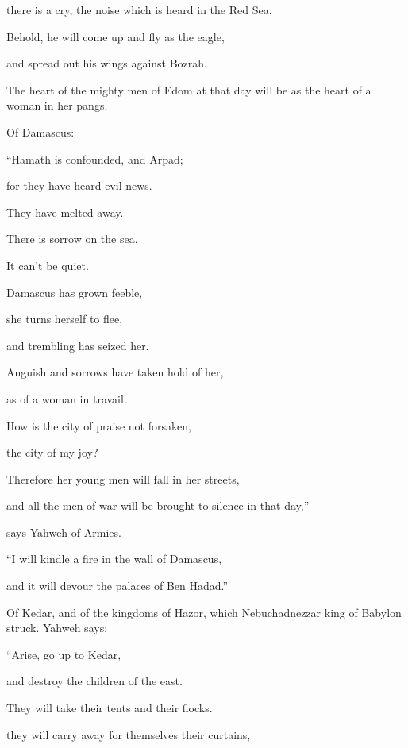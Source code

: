 {\par }{\QB there is a cry, the noise which is heard in the Red Sea.
\par }{\Q {}Behold, he will come up and fly as the eagle,
\par }{\QB and spread out his wings against Bozrah.
\par }{\QB The heart of the mighty men of Edom at that day will be as the heart of a woman in her pangs.
\par }{\BB \par }{\PP {}Of Damascus:
\par }{\Q “Hamath is confounded, and Arpad;
\par }{\QB for they have heard evil news.
\par }{\QB They have melted away.
\par }{\Q There is sorrow on the sea.
\par }{\QB It can’t be quiet.
\par }{\Q {}Damascus has grown feeble,
\par }{\QB she turns herself to flee,
\par }{\QB and trembling has seized her.
\par }{\Q Anguish and sorrows have taken hold of her,
\par }{\QB as of a woman in travail.
\par }{\Q {}How is the city of praise not forsaken,
\par }{\QB the city of my joy?
\par }{\Q {}Therefore her young men will fall in her streets,
\par }{\QB and all the men of war will be brought to silence in that day,”
\par }{\QB says Yahweh of Armies.
\par }{\Q {}“I will kindle a fire in the wall of Damascus,
\par }{\QB and it will devour the palaces of Ben Hadad.”
\par }{\BB \par }{\Q {}Of Kedar, and of the kingdoms of Hazor, which Nebuchadnezzar king of Babylon struck. Yahweh says:
\par }{\Q “Arise, go up to Kedar,
\par }{\QB and destroy the children of the east.
\par }{\Q {}They will take their tents and their flocks.
\par }{\QB they will carry away for themselves their curtains,
}
